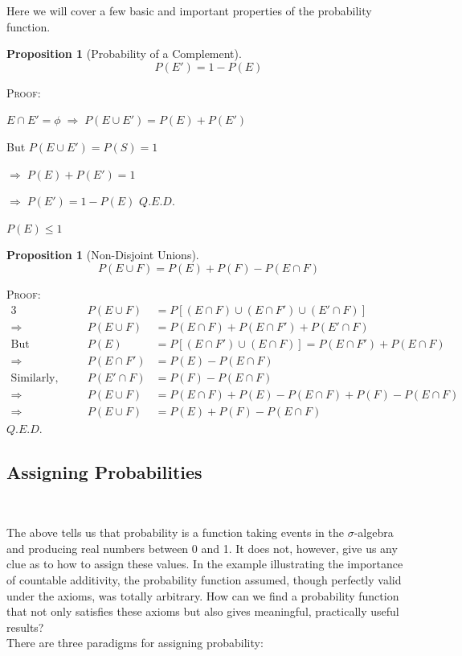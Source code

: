 \documentclass[12pt,a4paper]{article}
\newtheorem{prop}[thm]{Proposition}
\begin{document}
Here we will cover a few basic and important properties of the probability function.\par
\vspace{12pt}

\begin{prop}[Probability of a Complement]
$$P(E') = 1 - P(E)$$
\end{prop}

\noindent \textsc{Proof:}\par
\vspace{12pt}
\indent $E \cap E' = \phi \; \Rightarrow \; P(E \cup E') = P(E) + P(E')$\par
\indent But $P(E \cup E') = P(S) = 1$\par
\indent $\Rightarrow \; P(E) + P(E') = 1$\par
\indent $\Rightarrow \; P(E') = 1 - P(E)$ \hfill $Q.E.D.$\par

\vspace{12pt}
 $P(E) \leq 1$

\begin{prop}[Non-Disjoint Unions]
$$P(E \cup F) = P(E) + P(F) - P(E \cap F)$$
\end{prop}

\noindent\textsc{Proof:}
\begin{alignat*}{3}
& & P(E \cup F) &= P[(E \cap F) \cup (E \cap F') \cup (E' \cap F)]\\
\Rightarrow&\quad& P(E \cup F) &= P(E \cap F) + P(E \cap F') + P(E' \cap F)\\
\text{But }&\quad& P(E) &= P[(E \cap F') \cup (E \cap F)] = P(E \cap F') + P(E \cap F)\\
\Rightarrow&\quad& P(E \cap F') &= P(E) - P(E \cap F)\\
\text{Similarly,}&\quad& P(E' \cap F) &= P(F) - P(E \cap F)\\
\Rightarrow&\quad& P(E \cup F) &= P(E \cap F) + P(E) - P(E \cap F) + P(F) - P(E \cap F)\\
\Rightarrow&\quad& P(E \cup F) &= P(E) + P(F) - P(E \cap F)
\end{alignat*}\hfill $Q.E.D.$



\subsection{Assigning Probabilities}$\;$

The above tells us that probability is a function taking events in the $\sigma$-algebra and producing real numbers between 0 and 1. It does not, however, give us any clue as to how to assign these values. In the example illustrating the importance of countable additivity, the probability function assumed, though perfectly valid under the axioms, was totally arbitrary. How can we find a probability function that not only satisfies these axioms but also gives meaningful, practically useful results?\\
There are three paradigms for assigning probability:\par
\end{document}
